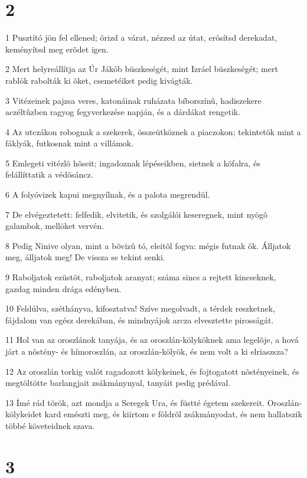 \chapter{2}

\par 1 Pusztító jön fel ellened; õrizd a várat, nézzed az útat, erõsítsd derekadat, keményítsd meg erõdet igen.
\par 2 Mert helyreállítja az Úr Jákób büszkeségét, mint Izráel büszkeségét; mert rablók rabolták ki õket, csemetéiket pedig kivágták.
\par 3 Vitézeinek pajzsa veres, katonáinak ruházata bíborszínû, hadiszekere aczéltûzben ragyog fegyverkezése napján, és a dárdákat rengetik.
\par 4 Az utczákon robognak a szekerek, összeütköznek a piaczokon; tekintetök mint a fáklyák, futkosnak mint a villámok.
\par 5 Emlegeti vitézlõ hõseit; ingadoznak lépéseikben, sietnek a kõfalra, és felállíttatik a védõsáncz.
\par 6 A folyóvizek kapui megnyílnak, és a palota megrendül.
\par 7 De elvégeztetett: felfedik, elvitetik, és szolgálói keseregnek, mint nyögõ galambok, mellöket vervén.
\par 8 Pedig Ninive olyan, mint a bõvizû tó, eleitõl fogva: mégis futnak õk. Álljatok meg, álljatok meg! De vissza se tekint senki.
\par 9 Raboljatok ezüstöt, raboljatok aranyat; száma sincs a rejtett kincseknek, gazdag minden drága edényben.
\par 10 Feldúlva, széthányva, kifosztatva! Szíve megolvadt, a térdek reszketnek, fájdalom van egész derekában, és mindnyájok arcza elvesztette pirosságát.
\par 11 Hol van az oroszlánok tanyája, és az oroszlán-kölyköknek ama legelõje, a hová járt a nõstény- és hímoroszlán, az oroszlán-kölyök, és nem volt a ki elriaszsza?
\par 12 Az oroszlán torkig valót ragadozott kölykeinek, és fojtogatott nõstényeinek, és megtöltötte barlangjait zsákmánynyal, tanyáit pedig prédával.
\par 13 Ímé rád török, azt mondja a Seregek Ura, és füstté égetem szekereit. Oroszlán-kölykeidet kard emészti meg, és kiirtom e földrõl zsákmányodat, és nem hallatszik többé követeidnek szava.

\chapter{3}


